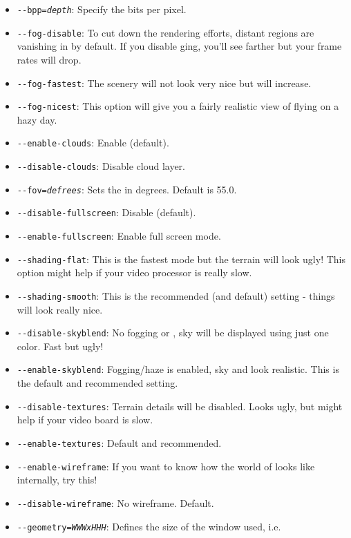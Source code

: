 \begin{itemize}
\item{\texttt{-$ $-bpp={\it depth}}}: Specify the bits per pixel.
\item{\texttt{-$ $-fog-disable}}: To cut down the rendering efforts, distant
  regions are vanishing in  by default. If you disable ging,
  you'll see farther but your frame rates will drop.
\item{\texttt{-$ $-fog-fastest}}: The scenery will not look very nice but
   will increase.
\item{\texttt{-$ $-fog-nicest}}: This option will give you a fairly realistic
  view of flying on a hazy day.
\item{\texttt{-$ $-enable-clouds}}: Enable  (default).
\item{\texttt{-$ $-disable-clouds}}: Disable cloud layer.
\item{\texttt{-$ $-fov={\it defrees}}}: Sets the  in degrees.
Default is 55.0.
\item{\texttt{-$ $-disable-fullscreen}}: Disable  (default).
\item{\texttt{-$ $-enable-fullscreen}}: Enable full screen mode.
\item{\texttt{-$ $-shading-flat}}: This is the fastest mode but the terrain will look ugly!
This option might help if your video processor is really slow.
\item{\texttt{-$ $-shading-smooth}}: This is the recommended (and default) setting - things will look really nice.
\item{\texttt{-$ $-disable-skyblend}}: No fogging or , sky will be displayed
  using just one color. Fast but ugly!
\item{\texttt{-$ $-enable-skyblend}}: Fogging/haze is enabled, sky and  look realistic. This is the default and recommended setting.
\item{\texttt{-$ $-disable-textures}}: Terrain details will be disabled. Looks ugly, but might help if your video board is slow.
\item{\texttt{-$ $-enable-textures}}: Default and recommended.
\item{\texttt{-$ $-enable-wireframe}}: If you want to know how the world of \FlightGear{} looks like internally, try
this!
\item{\texttt{-$ $-disable-wireframe}}: No wireframe. Default.
\item{\texttt{-$ $-geometry={\it WWWxHHH}}}: Defines the size of the window used, i.e.

\end{itemize}
